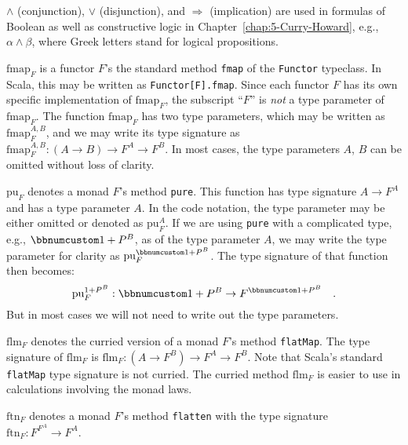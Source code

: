 $\wedge$ (conjunction), $\vee$ (disjunction), and $\Rightarrow$
(implication) are used in formulas of Boolean as well as constructive
logic in Chapter~\ref{chap:5-Curry-Howard}, e.g., $\alpha\wedge\beta$,
where Greek letters stand for logical propositions.

$\text{fmap}_{F}$ is a functor $F$\textsf{'}s the standard method \lstinline!fmap!
of the \lstinline!Functor! typeclass. In Scala, this may be written
as \texttt{}\lstinline!Functor[F].fmap!. Since each functor $F$
has its own specific implementation of $\text{fmap}_{F}$, the subscript
\textsf{``}$F$\textsf{''} is \emph{not} a type parameter of $\text{fmap}_{F}$. The
function $\text{fmap}_{F}$ has two type parameters, which may be
written as $\text{fmap}_{F}^{A,B}$, and we may write its type signature
as $\text{fmap}_{F}^{A,B}:\left(A\rightarrow B\right)\rightarrow F^{A}\rightarrow F^{B}$.
In most cases, the type parameters $A$, $B$ can be omitted without
loss of clarity.

$\text{pu}_{F}$ denotes a monad $F$\textsf{'}s method \lstinline!pure!.
This function has type signature $A\rightarrow F^{A}$ and has a type
parameter $A$. In the code notation, the type parameter may be either
omitted or denoted as $\text{pu}_{F}^{A}$. If we are using \lstinline!pure!
with a complicated type, e.g., $\bbnum 1+P^{B}$, as of the type parameter
$A$, we may write the type parameter for clarity as $\text{pu}_{F}^{\bbnum 1+P^{B}}$.
The type signature of that function then becomes: 
\[
\text{pu}_{F}^{1+P^{B}}:\bbnum 1+P^{B}\rightarrow F^{\bbnum 1+P^{B}}\quad.
\]
But in most cases we will not need to write out the type parameters.

$\text{flm}_{F}$ denotes the curried version of a monad $F$\textsf{'}s method
\lstinline!flatMap!. The type signature of $\text{flm}_{F}$ is $\text{flm}_{F}:(A\rightarrow F^{B})\rightarrow F^{A}\rightarrow F^{B}$.
Note that Scala\textsf{'}s standard \lstinline!flatMap! type signature is
not curried. The curried method $\text{flm}_{F}$ is easier to use
in calculations involving the monad laws.

$\text{ftn}_{F}$ denotes a monad $F$\textsf{'}s method \lstinline!flatten!
with the type signature $\text{ftn}_{F}:F^{F^{A}}\rightarrow F^{A}$.

